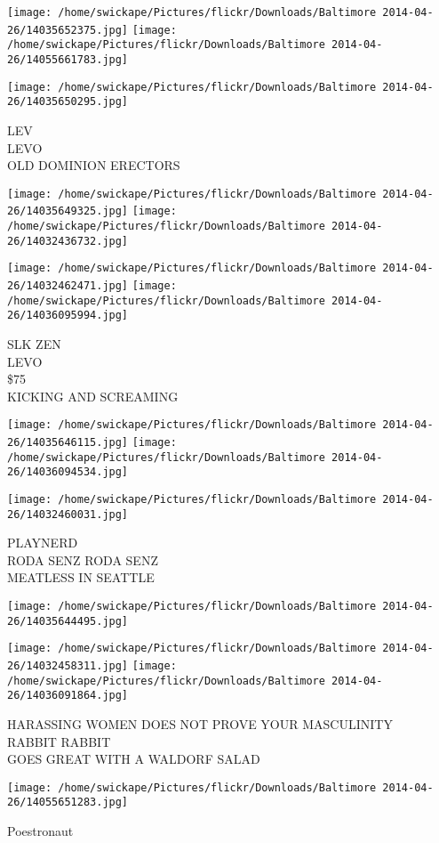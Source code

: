 \documentclass[10pt,letterpaper]{article}
\begin{document}
\texttt{[image: /home/swickape/Pictures/flickr/Downloads/Baltimore 2014-04-26/14035652375.jpg]}
\texttt{[image: /home/swickape/Pictures/flickr/Downloads/Baltimore 2014-04-26/14055661783.jpg]}

\vspace{0.25in}
\texttt{[image: /home/swickape/Pictures/flickr/Downloads/Baltimore 2014-04-26/14035650295.jpg]}

LEV\\
LEVO\\
OLD DOMINION ERECTORS\\
\pagebreak

\texttt{[image: /home/swickape/Pictures/flickr/Downloads/Baltimore 2014-04-26/14035649325.jpg]}
\texttt{[image: /home/swickape/Pictures/flickr/Downloads/Baltimore 2014-04-26/14032436732.jpg]}

\texttt{[image: /home/swickape/Pictures/flickr/Downloads/Baltimore 2014-04-26/14032462471.jpg]}
\texttt{[image: /home/swickape/Pictures/flickr/Downloads/Baltimore 2014-04-26/14036095994.jpg]}

SLK ZEN\\
LEVO\\
\$75\\
KICKING AND SCREAMING\\
\pagebreak

\texttt{[image: /home/swickape/Pictures/flickr/Downloads/Baltimore 2014-04-26/14035646115.jpg]}
\texttt{[image: /home/swickape/Pictures/flickr/Downloads/Baltimore 2014-04-26/14036094534.jpg]}

\texttt{[image: /home/swickape/Pictures/flickr/Downloads/Baltimore 2014-04-26/14032460031.jpg]}

PLAYNERD\\
RODA SENZ RODA SENZ\\
MEATLESS IN SEATTLE\\
\pagebreak

\texttt{[image: /home/swickape/Pictures/flickr/Downloads/Baltimore 2014-04-26/14035644495.jpg]}

\vspace{0.25in}
\texttt{[image: /home/swickape/Pictures/flickr/Downloads/Baltimore 2014-04-26/14032458311.jpg]}
\texttt{[image: /home/swickape/Pictures/flickr/Downloads/Baltimore 2014-04-26/14036091864.jpg]}

HARASSING WOMEN DOES NOT PROVE YOUR MASCULINITY\\
RABBIT RABBIT\\
GOES GREAT WITH A WALDORF SALAD\\
\pagebreak

\texttt{[image: /home/swickape/Pictures/flickr/Downloads/Baltimore 2014-04-26/14055651283.jpg]}

Poestronaut\\
\pagebreak
\end{document}

